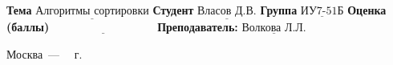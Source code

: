 \begin{titlepage}
      \noindent\textbf{Тема} $\underline{\text{Алгоритмы сортировки}}$\newline\newline
      \noindent\textbf{Студент} $\underline{\text{Власов Д.В.}}$\newline\newline
      \noindent\textbf{Группа} $\underline{\text{ИУ7-51Б}}$\newline\newline
      \noindent\textbf{Оценка (баллы)} $\underline{\text{~~~~~~~~~~~~~~~~~~~~~~~~~~~}}$\newline\newline
      \noindent\textbf{Преподаватель: } $\underline{\text{Волкова Л.Л.}}$\newline\newline\newline
      
      \begin{center}
          \vfill
          Москва~---~\the\year
          ~г.
      \end{center}
  \end{titlepage}
  